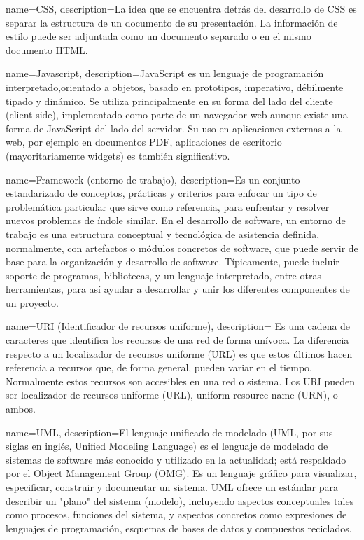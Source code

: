 {name=CSS,
description={La idea que se encuentra detrás del desarrollo de CSS es separar la estructura de un documento de su presentación. La información de estilo puede ser adjuntada como un documento separado o en el mismo documento HTML.}
}

{name=Javascript,
description={JavaScript es un lenguaje de programación interpretado,orientado a objetos, basado en prototipos, imperativo, débilmente tipado y dinámico. Se utiliza principalmente en su forma del lado del cliente (client-side), implementado como parte de un navegador web aunque existe una forma de JavaScript del lado del servidor. Su uso en aplicaciones externas a la web, por ejemplo en documentos PDF, aplicaciones de escritorio (mayoritariamente widgets) es también significativo.}
}

{name=Framework (entorno de trabajo),
 description={Es un conjunto estandarizado de conceptos, prácticas y criterios para enfocar un tipo de problemática particular que sirve como referencia, para enfrentar y resolver nuevos problemas de índole similar.
 En el desarrollo de software, un entorno de trabajo es una estructura conceptual y tecnológica de asistencia definida, normalmente, con artefactos o módulos concretos de software, que puede servir de base para la organización y desarrollo de software. Típicamente, puede incluir soporte de programas, bibliotecas, y un lenguaje interpretado, entre otras herramientas, para así ayudar a desarrollar y unir los diferentes componentes de un proyecto.}
 }

{name=URI (Identificador de recursos uniforme),
 description={ Es una cadena de caracteres que identifica los recursos de una red de forma unívoca. La diferencia respecto a un localizador de recursos uniforme (URL) es que estos últimos hacen referencia a recursos que, de forma general, pueden variar en el tiempo. Normalmente estos recursos son accesibles en una red o sistema. Los URI pueden ser localizador de recursos uniforme (URL), uniform resource name (URN), o ambos.}
 }

{name=UML,
 description={El lenguaje unificado de modelado (UML, por sus siglas en inglés, Unified Modeling Language) es el lenguaje de modelado de sistemas de software más conocido y utilizado en la actualidad; está respaldado por el Object Management Group (OMG).
 Es un lenguaje gráfico para visualizar, especificar, construir y documentar un sistema. UML ofrece un estándar para describir un "plano" del sistema (modelo), incluyendo aspectos conceptuales tales como procesos, funciones del sistema, y aspectos concretos como expresiones de lenguajes de programación, esquemas de bases de datos y compuestos reciclados.}
}

